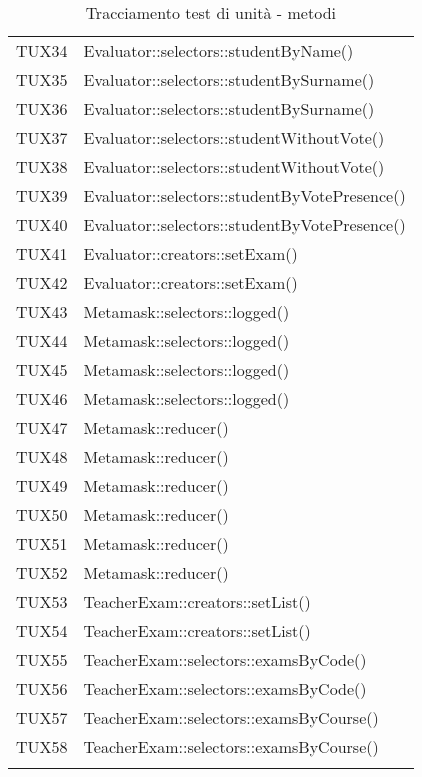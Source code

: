 \documentclass[PianoDiQualifica.tex]{subfiles}
\begin{document}
\begin{longtable}[H]{P{5cm}P{9cm}}
	TUX34 & Evaluator::selectors::studentByName() \\
	TUX35 & Evaluator::selectors::studentBySurname()\\
	TUX36 & Evaluator::selectors::studentBySurname() \\
	TUX37 & Evaluator::selectors::studentWithoutVote() \\
	TUX38 & Evaluator::selectors::studentWithoutVote() \\
	TUX39 & Evaluator::selectors::studentByVotePresence() \\
	TUX40 & Evaluator::selectors::studentByVotePresence() \\
	TUX41 & Evaluator::creators::setExam() \\
	TUX42 & Evaluator::creators::setExam() \\
	TUX43 & Metamask::selectors::logged() \\
	TUX44 & Metamask::selectors::logged() \\
	TUX45 & Metamask::selectors::logged() \\
	TUX46 & Metamask::selectors::logged() \\
	TUX47 & Metamask::reducer() \\
	TUX48 & Metamask::reducer() \\
	TUX49 & Metamask::reducer() \\
	TUX50 & Metamask::reducer() \\
	TUX51 & Metamask::reducer() \\
	TUX52 & Metamask::reducer() \\
	TUX53 & TeacherExam::creators::setList() \\
	TUX54 & TeacherExam::creators::setList() \\
	TUX55 & TeacherExam::selectors::examsByCode() \\
	TUX56 & TeacherExam::selectors::examsByCode() \\
	TUX57 & TeacherExam::selectors::examsByCourse() \\
	TUX58 & TeacherExam::selectors::examsByCourse() \\
	\hiderowcolors
	\caption{Tracciamento test di unità - metodi}
\end{longtable}
	
\end{document}
